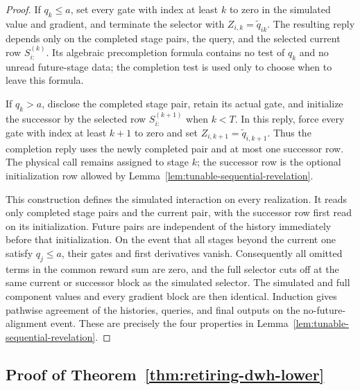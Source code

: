 \documentclass[11pt,a4paper]{article}
\theoremstyle{remark}
\begin{document}
\begin{proof}
If $q_k\le a$, set every gate with index at least $k$ to zero in the
simulated value and gradient, and terminate the selector with
$Z_{i,k}=\widetilde q_{ik}$. The resulting reply depends only on the
completed stage pairs, the query, and the selected current row
$S^{(k)}_{i:}$. Its algebraic precompletion formula contains no test of
$q_k$ and no unread future-stage data; the completion test is used only to
choose when to leave this formula.

If $q_k>a$, disclose the completed stage pair, retain its actual gate, and
initialize the successor by the selected row $S^{(k+1)}_{i:}$ when $k<T$.
In this reply, force every gate with index at least $k+1$ to zero and set
$Z_{i,k+1}=\widetilde q_{i,k+1}$. Thus the completion reply uses the newly
completed pair and at most one successor row. The physical call remains
assigned to stage $k$; the successor row is the optional initialization
row allowed by Lemma~\ref{lem:tunable-sequential-revelation}.

This construction defines the simulated interaction on every realization.
It reads only completed stage pairs and the current pair, with the
successor row first read on its initialization. Future pairs are independent
of the history immediately before that initialization. On the event that
all stages beyond the current one satisfy $q_j\le a$, their gates and first
derivatives vanish. Consequently all omitted terms in the common reward
sum are zero, and the full selector cuts off at the same current or
successor block as the simulated selector. The simulated and full component
values and every gradient block are then identical. Induction gives
pathwise agreement of the histories, queries, and final outputs on the
no-future-alignment event. These are precisely the four properties in
Lemma~\ref{lem:tunable-sequential-revelation}.
\end{proof}

\subsection{Proof of Theorem~\ref{thm:retiring-dwh-lower}}
\end{document}
